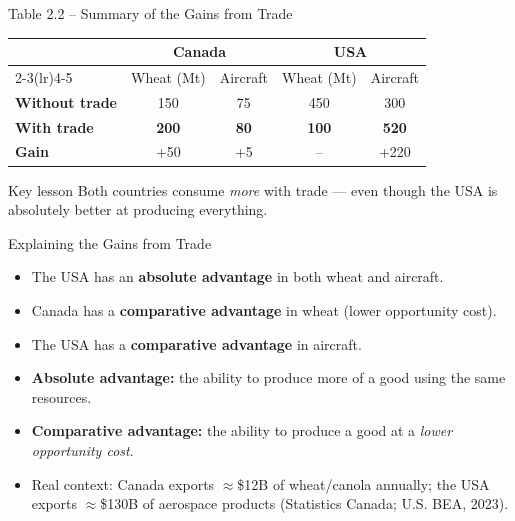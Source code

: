 \documentclass[aspectratio=169]{beamer}
\begin{document}
\begin{frame}{Table 2.2 -- Summary of the Gains from Trade}
\begin{center}
\renewcommand{\arraystretch}{1.5}
\begin{tabular}{lcccc}
\toprule
 & \multicolumn{2}{c}{\textbf{\color{accent}Canada}} & \multicolumn{2}{c}{\textbf{\color{canadared}USA}} \\
\cmidrule(lr){2-3}\cmidrule(lr){4-5}
 & Wheat (Mt) & Aircraft & Wheat (Mt) & Aircraft \\
\midrule
\textbf{Without trade} & 150 & 75 & 450 & 300 \\
\textbf{With trade} & \textcolor{ppfgreen}{\textbf{200}} & \textcolor{ppfgreen}{\textbf{80}} & \textcolor{ppfgreen}{\textbf{100}} & \textcolor{ppfgreen}{\textbf{520}} \\
\textbf{Gain} & \textcolor{leafgreen}{+50} & \textcolor{leafgreen}{+5} & \textcolor{leafgreen}{--} & \textcolor{leafgreen}{+220} \\
\bottomrule
\end{tabular}
\end{center}
\vspace{0.5em}
\begin{block}{Key lesson}
Both countries consume \emph{more} with trade --- even though the USA is absolutely better at producing everything.
\end{block}
\end{frame}

\begin{frame}{Explaining the Gains from Trade}
\transfade
\begin{itemize}
  \item The USA has an \textbf{absolute advantage} in both wheat and aircraft.
  \item Canada has a \textbf{comparative advantage} in wheat (lower opportunity cost).
  \item The USA has a \textbf{comparative advantage} in aircraft.
  \item \textbf{Absolute advantage:} the ability to produce more of a good using the same resources.
  \item \textbf{Comparative advantage:} the ability to produce a good at a \emph{lower opportunity cost}.
  \item Real context: Canada exports $\approx$\$12B of wheat/canola annually; the USA exports $\approx$\$130B of aerospace products (Statistics Canada; U.S. BEA, 2023).
\end{itemize}
\end{frame}
\end{document}
